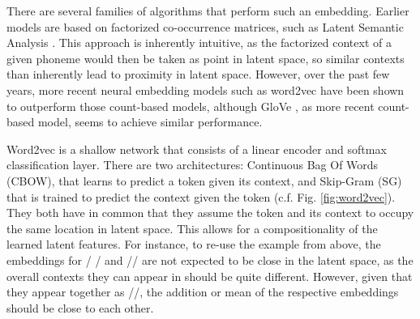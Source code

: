 \documentclass[6pt]{article}
\begin{document}
There are several families of algorithms that perform such an embedding. Earlier models are based on factorized co-occurrence matrices, such as Latent Semantic Analysis \cite{landauer2013handbook}. This approach is inherently intuitive, as the factorized context of a given phoneme would then be taken as point in latent space, so similar contexts than inherently lead to proximity in latent space. However, over the past few years, more recent neural embedding models such as word2vec \cite{mikolov2013efficient,mikolov2013distributed,goldberg2014word2vec}  have been shown to outperform those count-based models, although GloVe \cite{pennington2014glove}, as more recent count-based model, seems to achieve similar performance.

Word2vec is a shallow network that consists of a linear encoder and softmax classification layer. There are two architectures: Continuous Bag Of Words (CBOW), that learns to predict a token given its context, and Skip-Gram (SG) that is trained to predict the context given the token (c.f. Fig. \ref{fig:word2vec}). They both have in common that they assume the token and its context to occupy the same location in latent space. This allows for a compositionality of the learned latent features. For instance, to re-use the example from above, the embeddings for / / and // are not expected to be close in the latent space, as the overall contexts they can appear in should be quite different. However, given that they appear together as //, the addition or mean of the respective embeddings should be close to each other.
\end{document}
